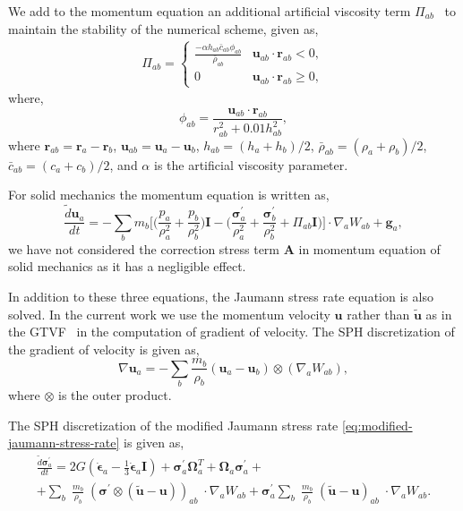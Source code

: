 \documentclass[preprint,12pt]{elsarticle}
\newcommand{\teng}[1]{\ensuremath{\boldsymbol{#1}}}
\newcommand{\ten}[1]{\ensuremath{\mathbf{#1}}}
\begin{document}
We add to the momentum equation an additional artificial viscosity term
$\Pi_{ab}$~\cite{monaghan-review:2005} to maintain the stability of the
numerical scheme, given as,
\begin{align}
  \label{eq:mom-av}
  \Pi_{ab} =
  \begin{cases}
\frac{-\alpha h_{ab} \bar{c}_{ab} \phi_{ab}}{\bar{\rho}_{ab}}
  & \ten{u}_{ab}\cdot \ten{r}_{ab} < 0, \\
  0 & \ten{u}_{ab}\cdot \ten{r}_{ab} \ge 0,
\end{cases}
\end{align}
where,
%
\begin{equation}
  \label{eq:av-phiij}
  \phi_{ab} = \frac{\ten{u}_{ab} \cdot \ten{r}_{ab}}{r^2_{ab} + 0.01 h^2_{ab}},
\end{equation}
%
where $\ten{r}_{ab} = \ten{r}_a - \ten{r}_b$, $\ten{u}_{ab} = \ten{u}_a -
\ten{u}_b$, $h_{ab} = (h_a + h_b)/2$, $\bar{\rho}_{ab} = (\rho_a + \rho_b)/2$,
$\bar{c}_{ab} = (c_a + c_b) / 2$, and $\alpha$ is the artificial
viscosity parameter.

%
For solid mechanics the momentum equation is written as,
\begin{equation}
  \label{eq:sph-momentum-solid}
  \frac{\tilde{d}\ten{u}_{a}}{dt} = - \sum_{b} m_b \bigg[
  \bigg(\frac{p_a}{\rho_a^2} + \frac{p_b}{\rho_b^2}\bigg) \ten{I} -
  \bigg(\frac{\teng{\sigma}^{'}_{a}}{\rho_a^2} +
  \frac{\teng{\sigma}^{'}_{b}}{\rho_b^2} + \Pi_{ab} \ten{I} \bigg) \bigg]  \cdot \nabla_{a} W_{ab} +
  \ten{g}_{a},
\end{equation}
we have not considered the correction stress term $\ten{A}$ in momentum
equation of solid mechanics as it has a negligible effect.

In addition to these three equations, the Jaumann stress rate equation is also
solved. In the current work we use the momentum velocity $\ten{u}$ rather than
$\tilde{\ten{u}}$ as in the GTVF~\cite{zhang_hu_adams17} in the computation of
gradient of velocity. The SPH discretization of the gradient of velocity is
given as,
\begin{equation}
  \label{eq:sph-vel-grad}
  \nabla \ten{u}_a =
  - \sum_{b} \frac{m_b}{\rho_{b}} (\ten{u}_{a} - \ten{u}_{b}) \otimes (\nabla_{a} W_{ab}),
\end{equation}
where $\otimes$ is the outer product.

The SPH discretization of the modified Jaumann stress rate
\cref{eq:modified-jaumann-stress-rate} is given as,
\begin{multline}
  \label{eq:sph-modified-jaumann-stress}
  \frac{\tilde{d}\teng{\sigma}^{'}_{a}}{dt} = 2G (\dot{\teng{\epsilon}}_{a} -
  \frac{1}{3} \dot{\teng{\epsilon}}_{a} \ten{I}) + \teng{\sigma}^{'}_{a}
  \teng{\Omega}_{a}^{T} +
  \teng{\Omega}_{a} \teng{\sigma}^{'}_{a} + \\
  + \sum_{b} \; \frac{m_b}{\rho_{b}} \; (\teng{\sigma}^{'} \otimes (\tilde{\ten{u}} -
  \ten{u}))_{ab} \; \cdot \nabla_{a} W_{ab}
  + \teng{\sigma}^{'}_{a} \sum_{b} \; \frac{m_b}{\rho_{b}} \;
  (\tilde{\ten{u}} - \ten{u})_{ab} \; \cdot \nabla_{a} W_{ab}.
\end{multline}
\end{document}
